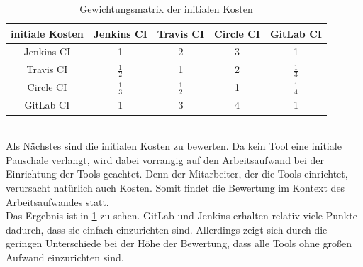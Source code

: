 \begin{table}[h!]
	\centering
	\begin{tabular}{c|cccc}
		initiale Kosten   & Jenkins CI		 & Travis CI& Circle CI & GitLab CI   \\ 
		\hline
		Jenkins CI      & 1     		      &        2       &      3      &      1     \\
		Travis CI &    $\frac{1}{2}$    & 1               &  2&$\frac{1}{3}$      \\
		Circle CI   &   $\frac{1}{3}$     &  $\frac{1}{2}$   & 1            & $\frac{1}{4}$  \\
		GitLab CI    &    1   &  3   &        4      & 1           \\
	\end{tabular}
	\caption{Gewichtungsmatrix der initialen Kosten}
	\label{icost}
\end{table}\\
Als Nächstes sind die initialen Kosten zu bewerten. Da kein Tool eine initiale Pauschale verlangt, wird dabei vorrangig auf den Arbeitsaufwand bei der Einrichtung der Tools geachtet. Denn der Mitarbeiter, der die Tools einrichtet, verursacht natürlich auch Kosten. Somit findet die Bewertung im Kontext des Arbeitsaufwandes statt.\\
 Das Ergebnis ist in \ref{icost} zu sehen. GitLab und Jenkins erhalten relativ viele Punkte dadurch, dass sie einfach einzurichten sind. Allerdings zeigt sich durch die geringen Unterschiede bei der Höhe der Bewertung, dass alle Tools ohne großen Aufwand einzurichten sind.
